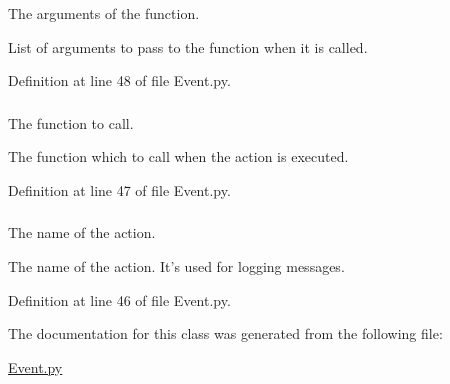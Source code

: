 The arguments of the function. 

List of arguments to pass to the function when it is called. 

Definition at line 48 of file Event.py.

\hypertarget{class_event_1_1_action_ad5e6ef3b81bd241bbff4583f0efdd851}{
\subsubsection[{\_\-\_\-function}]{}}
\label{class_event_1_1_action_ad5e6ef3b81bd241bbff4583f0efdd851}


The function to call. 

The function which to call when the action is executed. 

Definition at line 47 of file Event.py.

\hypertarget{class_event_1_1_action_a01e4cadf34243e09c4b67b9392fef22a}{
\subsubsection[{name}]{}}
\label{class_event_1_1_action_a01e4cadf34243e09c4b67b9392fef22a}


The name of the action. 

The name of the action. It's used for logging messages. 

Definition at line 46 of file Event.py.



The documentation for this class was generated from the following file:\begin{DoxyCompactItemize}
\item 
\hyperlink{_event_8py}{Event.py}\end{DoxyCompactItemize}
